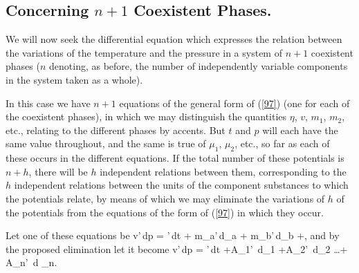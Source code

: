 \documentclass[12pt]{article}
\begin{document}
\subsection{Concerning $n +1$ Coexistent Phases.}
We will now seek the differential equation which expresses the relation between the variations of the temperature and the pressure in a system of $n + 1$ coexistent phases ($n$ denoting, as before, the number of independently variable components in the system taken as a whole). 


In this case we have  $n+1$ equations of the general form of (\ref{97}) (one for each of the coexistent phases), in which we may distinguish the quantities $\eta$, $v$, $m_1$, $m_2$, etc., relating to the different phases by accents. But $t$ and $p$ will each have the same value throughout, and the same is true of $\mu_1$, $\mu_2$, etc., so far as each of these occurs in the different equations. If the total number of these potentials is $n+h$, there will be $h$ independent relations between them, corresponding to the $h$ independent relations between the units of the component substances to which the potentials relate, by means of which we may eliminate the variations of $h$ of the potentials from the equations of the form of (\ref{97}) in which they occur.


Let one of these equations be
\eqs v'\,dp = \eta'\,dt + m_a'\,d\mu_a + m_b'\,d\mu_b +, \label{124}\eqe
and by the proposed elimination let it become
\eqs v'\,dp = \eta'\,dt +A_1' \,d\mu_1 +A_2' \,d\mu_2  \dots + A_n' \,d \mu_n.\label{125}\eqe
\end{document}
